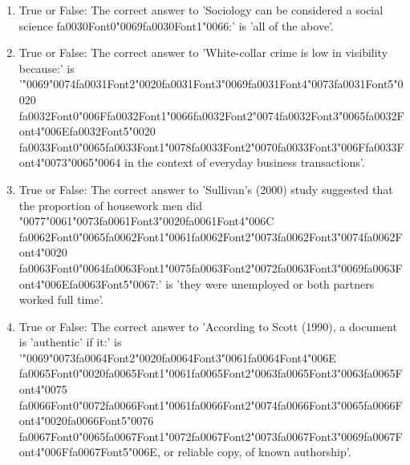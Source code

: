 \documentclass[12pt]{article}
\begin{document}
\begin{enumerate}[label=\arabic*.]
\item True or False: The correct answer to 'Sociology can be considered a social science {\csname fa0030Font0\endcsname\char"0069}{\csname fa0030Font1\endcsname\char"0066}:' is 'all of the above'.
\item True or False: The correct answer to 'White-collar crime is low in visibility because:' is '{\char"0069}{\char"0074}{\csname fa0031Font2\endcsname\char"0020}{\csname fa0031Font3\endcsname\char"0069}{\csname fa0031Font4\endcsname\char"0073}{\csname fa0031Font5\endcsname\char"0020} {\csname fa0032Font0\endcsname\char"006F}{\csname fa0032Font1\endcsname\char"0066}{\csname fa0032Font2\endcsname\char"0074}{\csname fa0032Font3\endcsname\char"0065}{\csname fa0032Font4\endcsname\char"006E}{\csname fa0032Font5\endcsname\char"0020} {\csname fa0033Font0\endcsname\char"0065}{\csname fa0033Font1\endcsname\char"0078}{\csname fa0033Font2\endcsname\char"0070}{\csname fa0033Font3\endcsname\char"006F}{\csname fa0033Font4\endcsname\char"0073}{\char"0065}{\char"0064} in the context of everyday business transactions'.
\item True or False: The correct answer to 'Sullivan's (2000) study suggested that the proportion of housework men did {\char"0077}{\char"0061}{\char"0073}{\csname fa0061Font3\endcsname\char"0020}{\csname fa0061Font4\endcsname\char"006C} {\csname fa0062Font0\endcsname\char"0065}{\csname fa0062Font1\endcsname\char"0061}{\csname fa0062Font2\endcsname\char"0073}{\csname fa0062Font3\endcsname\char"0074}{\csname fa0062Font4\endcsname\char"0020} {\csname fa0063Font0\endcsname\char"0064}{\csname fa0063Font1\endcsname\char"0075}{\csname fa0063Font2\endcsname\char"0072}{\csname fa0063Font3\endcsname\char"0069}{\csname fa0063Font4\endcsname\char"006E}{\csname fa0063Font5\endcsname\char"0067}:' is 'they were unemployed or both partners worked full time'.
\item True or False: The correct answer to 'According to Scott (1990), a document is 'authentic' if it:' is '{\char"0069}{\char"0073}{\csname fa0064Font2\endcsname\char"0020}{\csname fa0064Font3\endcsname\char"0061}{\csname fa0064Font4\endcsname\char"006E} {\csname fa0065Font0\endcsname\char"0020}{\csname fa0065Font1\endcsname\char"0061}{\csname fa0065Font2\endcsname\char"0063}{\csname fa0065Font3\endcsname\char"0063}{\csname fa0065Font4\endcsname\char"0075} {\csname fa0066Font0\endcsname\char"0072}{\csname fa0066Font1\endcsname\char"0061}{\csname fa0066Font2\endcsname\char"0074}{\csname fa0066Font3\endcsname\char"0065}{\csname fa0066Font4\endcsname\char"0020}{\csname fa0066Font5\endcsname\char"0076} {\csname fa0067Font0\endcsname\char"0065}{\csname fa0067Font1\endcsname\char"0072}{\csname fa0067Font2\endcsname\char"0073}{\csname fa0067Font3\endcsname\char"0069}{\csname fa0067Font4\endcsname\char"006F}{\csname fa0067Font5\endcsname\char"006E}, or reliable copy, of known authorship'.

\end{enumerate}
\end{document}
